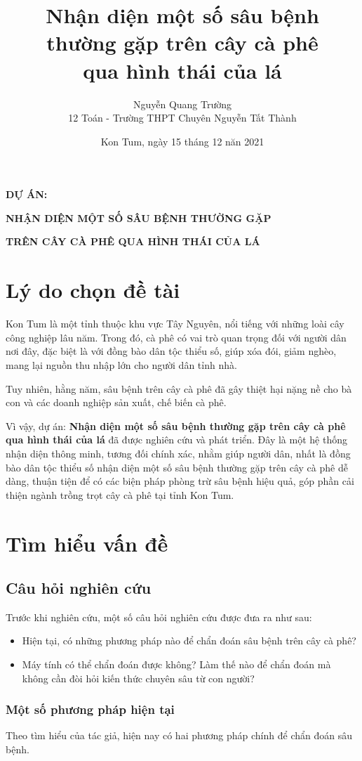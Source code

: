 \documentclass[a4paper,14pt]{extarticle}
\title{\textbf{Nhận diện một số sâu bệnh\\thường gặp trên cây cà phê\\qua hình thái của lá}}
\author{Nguyễn Quang Trường\\12 Toán - Trường THPT Chuyên Nguyễn Tất Thành}
\date{Kon Tum, ngày 15 tháng 12 năn 2021}
\begin{document}
\tableofcontents
\pagebreak

\centerline{\textbf{DỰ ÁN:}}

\begingroup
	\fontsize{18pt}{1pt}\selectfont
	\centerline{\textbf{NHẬN DIỆN MỘT SỐ SÂU BỆNH THƯỜNG GẶP}}
	\centerline{\textbf{TRÊN CÂY CÀ PHÊ QUA HÌNH THÁI CỦA LÁ}}
\endgroup

\section{Lý do chọn đề tài}
Kon Tum là một tỉnh thuộc khu vực Tây Nguyên, nổi tiếng với những loài cây công nghiệp lâu năm. Trong đó, cà phê có vai trò quan trọng đối với người dân nơi đây, đặc biệt là với đồng bào dân tộc thiểu số, giúp xóa đói, giảm nghèo, mang lại nguồn thu nhập lớn cho người dân tỉnh nhà.

Tuy nhiên, hằng năm, sâu bệnh trên cây cà phê đã gây thiệt hại nặng nề cho bà con và các doanh nghiệp sản xuất, chế biến cà phê.

Vì vậy, dự án: \textbf{Nhận diện một số sâu bệnh thường gặp trên cây cà phê qua hình thái của lá} đã được nghiên cứu và phát triển. Đây là một hệ thống nhận diện thông minh, tương đối chính xác, nhằm giúp người dân, nhất là đồng bào dân tộc thiểu số nhận diện một số sâu bệnh thường gặp trên cây cà phê dễ dàng, thuận tiện để có các biện pháp phòng trừ sâu bệnh hiệu quả, góp phần cải thiện ngành trồng trọt cây cà phê tại tỉnh Kon Tum.

\section{Tìm hiểu vấn đề}

	\subsection{Câu hỏi nghiên cứu}
	Trước khi nghiên cứu, một số câu hỏi nghiên cứu được đưa ra như sau:
	\begin{itemize}
		\item Hiện tại, có những phương pháp nào để chẩn đoán sâu bệnh trên
		cây cà phê?
		\item Máy tính có thể chẩn đoán được không? Làm thế nào để chẩn đoán mà không cần đòi hỏi kiến thức chuyên sâu từ con người?
	\end{itemize}

		\subsubsection{Một số phương pháp hiện tại}
		Theo tìm hiểu của tác giả, hiện nay có hai phương pháp chính để chẩn đoán sâu bệnh.
		
\end{document}
